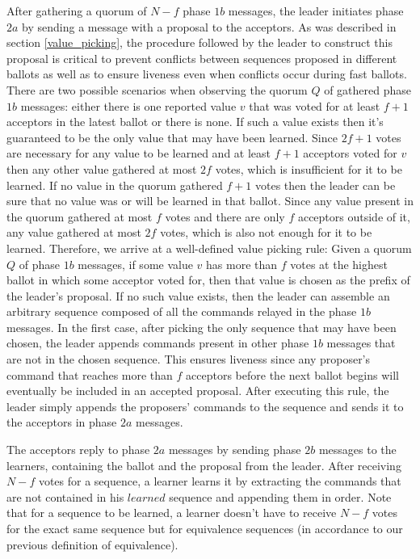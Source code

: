 After gathering a quorum of $N-f$ phase $1b$ messages, the leader initiates phase $2a$ by sending a message with a proposal to the acceptors. As was described in section \ref{value_picking}, the procedure followed by the leader to construct this proposal is critical to prevent conflicts between sequences proposed in different ballots as well as to ensure liveness even when conflicts occur during fast ballots. There are two possible scenarios when observing the quorum $Q$ of gathered phase $1b$ messages: either there is one reported value $v$ that was voted for at least $f+1$ acceptors in the latest ballot or there is none. If such a value exists then it's guaranteed to be the only value that may have been learned. Since $2f+1$ votes are necessary for any value to be learned and at least $f+1$ acceptors voted for $v$ then any other value gathered at most $2f$ votes, which is insufficient for it to be learned. If no value in the quorum gathered $f+1$ votes then the leader can be sure that no value was or will be learned in that ballot. Since any value present in the quorum gathered at most $f$ votes and there are only $f$ acceptors outside of it, any value gathered at most $2f$ votes, which is also not enough for it to be learned. Therefore, we arrive at a well-defined value picking rule: Given a quorum $Q$ of phase $1b$ messages, if some value $v$ has more than $f$ votes at the highest ballot in which some acceptor voted for, then that value is chosen as the prefix of the leader's proposal. If no such value exists, then the leader can assemble an arbitrary sequence composed of all the commands relayed in the phase $1b$ messages. In the first case, after picking the only sequence that may have been chosen, the leader appends commands present in other phase $1b$ messages that are not in the chosen sequence. This ensures liveness since any proposer's command that reaches more than $f$ acceptors before the next ballot begins will eventually be included in an accepted proposal. After executing this rule, the leader simply appends the proposers' commands to the sequence and sends it to the acceptors in phase $2a$ messages.\par

The acceptors reply to phase $2a$ messages by sending phase $2b$ messages to the learners, containing the ballot and the proposal from the leader. After receiving $N-f$ votes for a sequence, a learner learns it by extracting the commands that are not contained in his $learned$ sequence and appending them in order. Note that for a sequence to be learned, a learner doesn't have to receive $N-f$ votes for the exact same sequence but for equivalence sequences (in accordance to our previous definition of equivalence).

